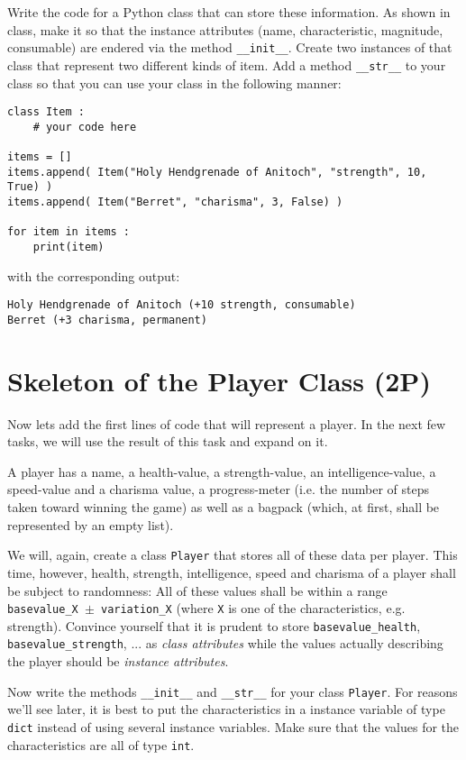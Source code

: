 \documentclass[
	english,
	fontsize=10pt,
	parskip=half,
	titlepage=true,
	DIV=12
]{scrartcl}
\newcommand*{\inPy}[1]{\texttt{#1}}
\newcommand*{\ie}{i.\;e. }
\newcommand*{\eg}{e.\;g. }
\begin{document}
Write the code for a Python class that can store these information. As shown in class, make it so that the instance attributes (name, characteristic, magnitude, consumable) are endered via the method \inPy{__init__}. Create two instances of that class that represent two different kinds of item. Add a method \inPy{__str__} to your class so that you can use your class in the following manner:

\begin{verbatim}
class Item :
    # your code here

items = []
items.append( Item("Holy Hendgrenade of Anitoch", "strength", 10, True) )
items.append( Item("Berret", "charisma", 3, False) )

for item in items :
    print(item)
\end{verbatim}

with the corresponding output:
\begin{verbatim}
Holy Hendgrenade of Anitoch (+10 strength, consumable)
Berret (+3 charisma, permanent)
\end{verbatim}


\section{Skeleton of the Player Class (2\;P)}
Now lets add the first lines of code that will represent a player. In the next few tasks, we will use the result of this task and expand on it.

A player has a name, a health-value, a strength-value, an intelligence-value, a speed-value and a charisma value, a progress-meter (\ie the number of steps taken toward winning the game) as well as a bagpack (which, at first, shall be represented by an empty list).

We will, again, create a class \texttt{Player} that stores all of these data per player. This time, however, health, strength, intelligence, speed and charisma of a player shall be subject to randomness: All of these values shall be within a range \texttt{basevalue\_X $\pm$ variation\_X} (where \texttt{X} is one of the characteristics, \eg strength). Convince yourself that it is prudent to store \texttt{basevalue\_health}, \texttt{basevalue\_strength}, ... as \emph{class attributes} while the values actually describing the player should be \emph{instance attributes}.

Now write the methods \inPy{__init__} and \inPy{__str__} for your class \texttt{Player}. For reasons we'll see later, it is best to put the characteristics in a instance variable of type \inPy{dict} instead of using several instance variables. Make sure that the values for the characteristics are all of type \inPy{int}.
\end{document}
